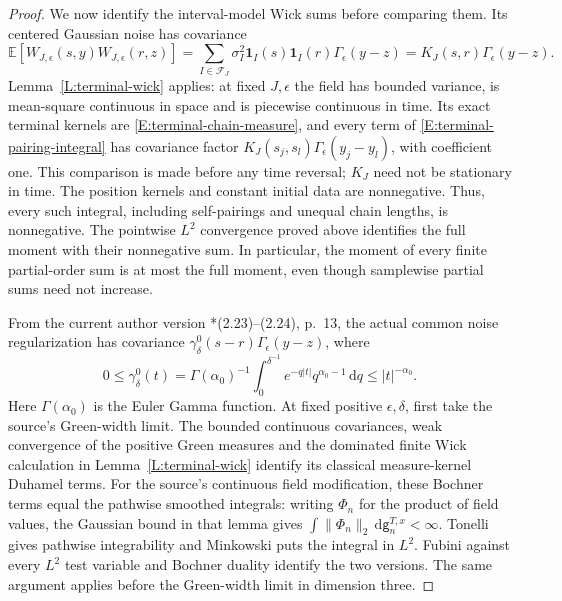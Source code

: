 \documentclass[12pt]{article}
\numberwithin{equation}{section}
\theoremstyle{definition}
\newcommand{\E}{\mathbb{E}}
\newcommand{\ud}{\,\mathrm{d}}
\begin{document}
\begin{proof}
  We now identify the interval-model Wick sums before comparing them.
  Its centered Gaussian noise has covariance
  \[
    \E[W_{J,\epsilon}(s,y)W_{J,\epsilon}(r,z)]
    =\sum_{I\in\mathcal F_J}\sigma_I^2
    \mathbf1_I(s)\mathbf1_I(r)\Gamma_\epsilon(y-z)
    =K_J(s,r)\Gamma_\epsilon(y-z).
  \]
  Lemma~\ref{L:terminal-wick} applies: at fixed $J,\epsilon$ the field
  has bounded variance, is mean-square continuous in space and is
  piecewise continuous in time. Its exact terminal kernels are
  \eqref{E:terminal-chain-measure}, and every term of
  \eqref{E:terminal-pairing-integral} has covariance factor
  $K_J(s_j,s_l)\Gamma_\epsilon(y_j-y_l)$, with coefficient one.
  This comparison is made before any time reversal; $K_J$ need not be
  stationary in time. The position kernels and constant initial data
  are nonnegative. Thus, every such integral, including self-pairings
  and unequal chain lengths, is nonnegative. The pointwise $L^2$ convergence
  proved above identifies the full moment with their nonnegative sum.
  In particular, the moment of every finite partial-order sum is at most
  the full moment, even though samplewise partial sums need not increase.

  From the current author version
  \cite{chen:author2026:time-dependency}*{(2.23)--(2.24), p.~13},
  the actual common noise regularization has covariance
  $\gamma_\delta^0(s-r)\Gamma_\epsilon(y-z)$, where
  \[
    0\le\gamma_\delta^0(t)
    =\Gamma(\alpha_0)^{-1}\int_0^{\delta^{-1}}
    e^{-q|t|}q^{\alpha_0-1}\ud q
    \le |t|^{-\alpha_0}.
  \]
  Here $\Gamma(\alpha_0)$ is the Euler Gamma function.
  At fixed positive $\epsilon,\delta$, first take the source's Green-width
  limit. The bounded continuous covariances, weak convergence of the
  positive Green measures and the dominated finite Wick calculation in
  Lemma~\ref{L:terminal-wick} identify its classical measure-kernel
  Duhamel terms. For the source's continuous field modification, these
  Bochner terms equal the pathwise smoothed integrals: writing $\Phi_n$
  for the product of field values, the Gaussian bound in that lemma gives
  $\int\|\Phi_n\|_2\ud\mathsf g_n^{T,x}<\infty$.
  Tonelli gives pathwise integrability and Minkowski puts the integral
  in $L^2$. Fubini against every $L^2$ test variable and Bochner duality
  identify the two versions. The same argument applies before the
  Green-width limit in dimension three.


\end{proof}
\end{document}
